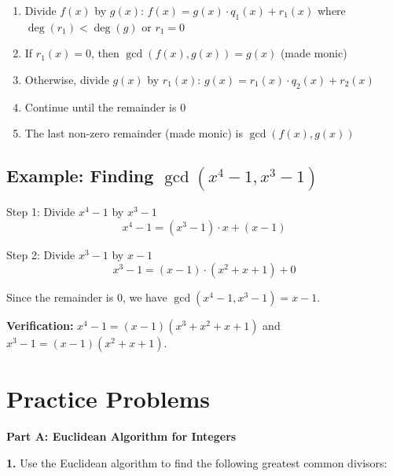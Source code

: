 \documentclass[12pt]{article}
\begin{document}
\begin{enumerate}
\item Divide $f(x)$ by $g(x)$: $f(x) = g(x) \cdot q_1(x) + r_1(x)$ where $\deg(r_1) < \deg(g)$ or $r_1 = 0$
\item If $r_1(x) = 0$, then $\gcd(f(x), g(x)) = g(x)$ (made monic)
\item Otherwise, divide $g(x)$ by $r_1(x)$: $g(x) = r_1(x) \cdot q_2(x) + r_2(x)$
\item Continue until the remainder is $0$
\item The last non-zero remainder (made monic) is $\gcd(f(x), g(x))$
\end{enumerate}

\subsection{Example: Finding $\gcd(x^4 - 1, x^3 - 1)$}

Step 1: Divide $x^4 - 1$ by $x^3 - 1$
$$x^4 - 1 = (x^3 - 1) \cdot x + (x - 1)$$

Step 2: Divide $x^3 - 1$ by $x - 1$
$$x^3 - 1 = (x - 1) \cdot (x^2 + x + 1) + 0$$

Since the remainder is $0$, we have $\gcd(x^4 - 1, x^3 - 1) = x - 1$.

\textbf{Verification:} $x^4 - 1 = (x-1)(x^3 + x^2 + x + 1)$ and $x^3 - 1 = (x-1)(x^2 + x + 1)$.

\newpage

\section{Practice Problems}

\textbf{Part A: Euclidean Algorithm for Integers}

\textbf{1.} Use the Euclidean algorithm to find the following greatest common divisors:
\end{document}
